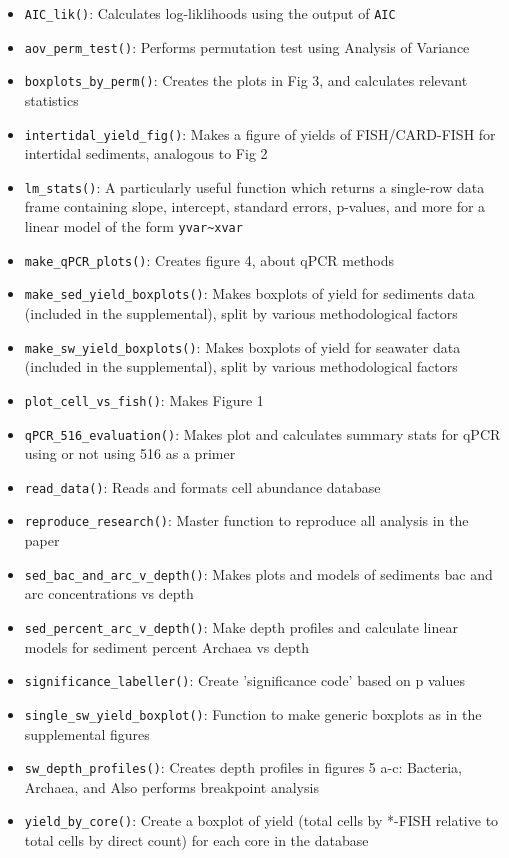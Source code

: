 \documentclass{article}
\begin{document}
\begin{itemize}
  \item \texttt{AIC\_lik()}: Calculates log-liklihoods using the output of \texttt{AIC}
  \item \texttt{aov\_perm\_test()}: Performs permutation test using Analysis of Variance
  \item \texttt{boxplots\_by\_perm()}: Creates the plots in Fig 3, and calculates relevant statistics
  \item \texttt{intertidal\_yield\_fig()}: Makes a figure of yields of FISH/CARD-FISH for intertidal sediments, analogous to Fig 2
  \item \texttt{lm\_stats()}: A particularly useful function which returns a single-row data frame containing slope, intercept, standard errors, p-values, and more for a linear model of the form \texttt{yvar\textasciitilde xvar}
  \item \texttt{make\_qPCR\_plots()}: Creates figure 4, about qPCR methods
  \item \texttt{make\_sed\_yield\_boxplots()}: Makes boxplots of yield for sediments data (included in the supplemental), split by various methodological factors
  \item \texttt{make\_sw\_yield\_boxplots()}: Makes boxplots of yield for seawater data (included in the supplemental), split by various methodological factors
  \item \texttt{plot\_cell\_vs\_fish()}: Makes Figure 1
  \item \texttt{qPCR\_516\_evaluation()}: Makes plot and calculates summary stats for qPCR using or not using 516 as a primer
  \item \texttt{read\_data()}: Reads and formats cell abundance database
  \item \texttt{reproduce\_research()}: Master function to reproduce all analysis in the paper
  \item \texttt{sed\_bac\_and\_arc\_v\_depth()}: Makes plots and models of sediments bac and arc concentrations vs depth
  \item \texttt{sed\_percent\_arc\_v\_depth()}: Make depth profiles and calculate linear models for sediment percent Archaea vs depth
  \item \texttt{significance\_labeller()}: Create 'significance code' based on p values
  \item \texttt{single\_sw\_yield\_boxplot()}: Function to make generic boxplots as in the supplemental figures
  \item \texttt{sw\_depth\_profiles()}: Creates depth profiles in figures 5 a-c: Bacteria, Archaea, and Also performs breakpoint analysis
  \item \texttt{yield\_by\_core()}: Create a boxplot of yield (total cells by *-FISH relative to total cells by direct count) for each core in the database
\end{itemize}
\end{document}
